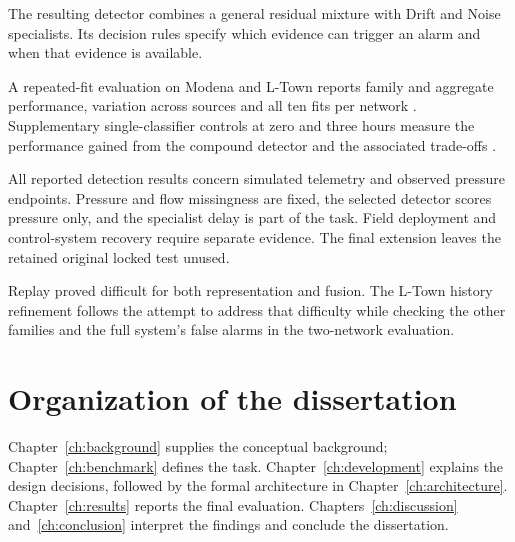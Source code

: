 The resulting detector combines a general residual mixture with Drift and Noise specialists. Its decision rules specify which evidence can trigger an alarm and when that evidence is available.

A repeated-fit evaluation on Modena and L-Town reports family and aggregate performance, variation across sources and all ten fits per network \cite{projectfinal}. Supplementary single-classifier controls at zero and three hours measure the performance gained from the compound detector and the associated trade-offs \cite{projectbaseline}.

All reported detection results concern simulated telemetry and observed pressure endpoints. Pressure and flow missingness are fixed, the selected detector scores pressure only, and the specialist delay is part of the task. Field deployment and control-system recovery require separate evidence. The final extension leaves the retained original locked test unused.

Replay proved difficult for both representation and fusion. The L-Town history refinement follows the attempt to address that difficulty while checking the other families and the full system's false alarms in the two-network evaluation.

\section{Organization of the dissertation}
Chapter~\ref{ch:background} supplies the conceptual background; Chapter~\ref{ch:benchmark} defines the task. Chapter~\ref{ch:development} explains the design decisions, followed by the formal architecture in Chapter~\ref{ch:architecture}. Chapter~\ref{ch:results} reports the final evaluation. Chapters~\ref{ch:discussion} and~\ref{ch:conclusion} interpret the findings and conclude the dissertation.
